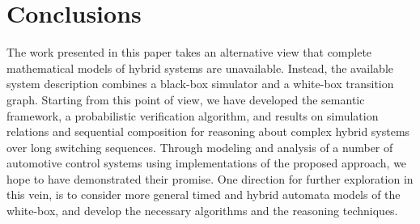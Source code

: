 \section{Conclusions}
\label{sec:cs}

The work presented in this paper takes an alternative view that complete mathematical models of hybrid systems are unavailable. Instead, the available system description combines a black-box simulator and a white-box transition graph.
%
Starting from this point of view, we have developed the semantic framework, a probabilistic verification algorithm, and results on
simulation relations and sequential composition for reasoning about
complex hybrid systems over long switching sequences.
% 
Through modeling and analysis of a number of automotive control systems using implementations of the proposed approach, we hope to have demonstrated their promise.
%
One direction for further exploration in this vein,
is to consider more general timed and hybrid automata models of the white-box, and develop the necessary algorithms and the reasoning techniques.  %
